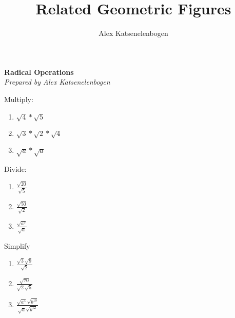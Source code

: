 \documentclass{article}
\title{Related Geometric Figures}
\author{Alex Katsenelenbogen}
\begin{document}
\begin{center}
      \Large\textbf{Radical Operations}\\
      \large\textit{Prepared by Alex Katsenelenbogen}
   \end{center}

Multiply:
\begin{enumerate}

\item $\sqrt{4} * \sqrt{5}$
\item $\sqrt{3} * \sqrt{2} * \sqrt{4}$
\item $\sqrt{a} * \sqrt{a}$

\end{enumerate}

Divide:
\begin{enumerate}

\item $\frac{\sqrt{20}}{\sqrt{5}}$
\item $\frac{\sqrt{50}}{\sqrt{2}}$
\item $\frac{\sqrt{a^5}}{ \sqrt{a}}$

\end{enumerate}


Simplify
\begin{enumerate}

\item $\frac{\sqrt{3}\sqrt{9}}{\sqrt{2}}$

\item $\frac{\sqrt{70}}{\sqrt{2}\sqrt{5}}$
\item $\frac{\sqrt{a^5}\sqrt{b^{10}}}{ \sqrt{a}\sqrt{b^{12}}}$

\end{enumerate}
\end{document}
